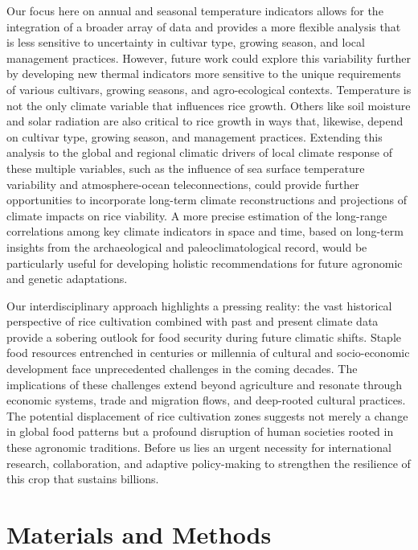 \documentclass[
  letterpaper,
  DIV=11,
  numbers=noendperiod]{scrartcl}
\begin{document}
Our focus here on annual and seasonal temperature indicators allows for
the integration of a broader array of data and provides a more flexible
analysis that is less sensitive to uncertainty in cultivar type, growing
season, and local management practices. However, future work could
explore this variability further by developing new thermal indicators
more sensitive to the unique requirements of various cultivars, growing
seasons, and agro-ecological contexts. Temperature is not the only
climate variable that influences rice growth. Others like soil moisture
and solar radiation are also critical to rice growth in ways that,
likewise, depend on cultivar type, growing season, and management
practices. Extending this analysis to the global and regional climatic
drivers of local climate response of these multiple variables, such as
the influence of sea surface temperature variability and
atmosphere-ocean teleconnections, could provide further opportunities to
incorporate long-term climate reconstructions and projections of climate
impacts on rice viability. A more precise estimation of the long-range
correlations among key climate indicators in space and time, based on
long-term insights from the archaeological and paleoclimatological
record, would be particularly useful for developing holistic
recommendations for future agronomic and genetic adaptations.

Our interdisciplinary approach highlights a pressing reality: the vast
historical perspective of rice cultivation combined with past and
present climate data provide a sobering outlook for food security during
future climatic shifts. Staple food resources entrenched in centuries or
millennia of cultural and socio-economic development face unprecedented
challenges in the coming decades. The implications of these challenges
extend beyond agriculture and resonate through economic systems, trade
and migration flows, and deep-rooted cultural practices. The potential
displacement of rice cultivation zones suggests not merely a change in
global food patterns but a profound disruption of human societies rooted
in these agronomic traditions. Before us lies an urgent necessity for
international research, collaboration, and adaptive policy-making to
strengthen the resilience of this crop that sustains billions.

\section{Materials and Methods}\label{materials-and-methods}
\end{document}
